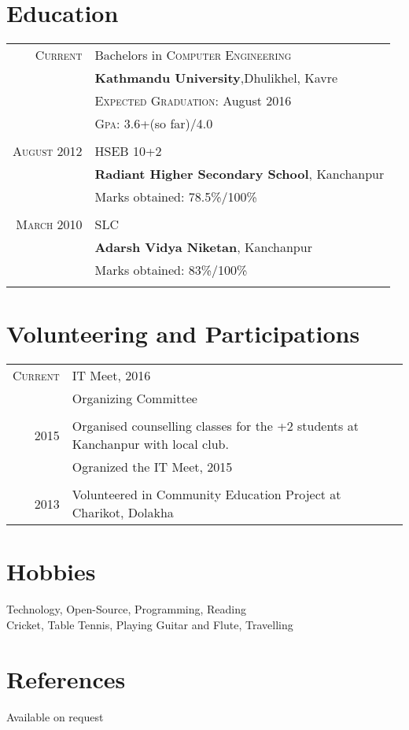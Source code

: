 \documentclass[a4paper,10pt]{article}
\begin{document}
\section{Education}
\begin{tabular}{rl}	
 \textsc{Current}  & Bachelors in \textsc{Computer Engineering}\\
& \textbf{Kathmandu University},Dhulikhel, Kavre\\
& \normalsize \textsc{Expected Graduation}: August 2016\\
& \normalsize \textsc{Gpa}: 3.6+(so far)/4.0\\\\
\textsc{August} 2012& HSEB 10+2 \\ 
&\normalsize\textbf{Radiant Higher Secondary School}, Kanchanpur\\
&Marks obtained: 78.5\%/100\%\\&\\
\textsc{March} 2010& SLC\\ & \textbf{Adarsh Vidya Niketan}, Kanchanpur\\
&Marks obtained: 83\%/100\%\\&\\
\end{tabular}



\section{Volunteering and Participations}
\begin{tabular}{rl}	
 \textsc{Current}  & IT Meet, 2016\\
 				& Organizing Committee\\\\
 \textsc{2015} & Organised counselling classes for the +2 students at Kanchanpur with local club.\\
 &Ogranized the IT Meet, 2015\\\\
 \textsc{2013} & Volunteered in Community Education Project at Charikot, Dolakha
\end{tabular}


\section{Hobbies}
Technology, Open-Source, Programming, Reading\\
Cricket, Table Tennis, Playing Guitar and Flute, Travelling\\

\section{References}
Available on request
\end{document}
